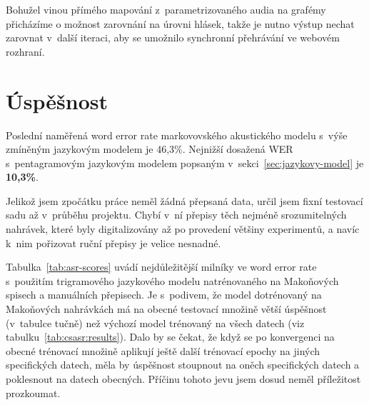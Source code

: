 Bohužel vinou přímého mapování z~parametrizovaného audia na grafémy přicházíme o
možnost zarovnání na úrovni hlásek, takže je nutno výstup nechat zarovnat
v~další iteraci, aby se umožnilo synchronní přehrávání ve webovém rozhraní.

\section{Úspěšnost}
\label{sec:evaluace}

Poslední naměřená word error rate markovovského akustického modelu s~výše zmíněným
jazykovým modelem je 46,3\%. Nejnižší dosažená WER s~pentagramovým jazykovým
modelem popsaným v~sekci~\ref{sec:jazykovy-model} je \textbf{10,3\%}.

Jelikož jsem zpočátku práce neměl žádná přepsaná data, určil jsem fixní testovací sadu
až v~průběhu projektu. Chybí v~ní přepisy těch
nejméně srozumitelných nahrávek, které byly digitalizovány až po provedení
většiny experimentů, a navíc k~nim pořizovat ruční přepisy je velice nesnadné.

Tabulka~\ref{tab:asr-scores} uvádí nejdůležitější milníky ve word error rate
s~použitím trigramového jazykového modelu natrénovaného na Makoňových spisech a
manuálních přepisech. Je
s~podivem, že model dotrénovaný na Makoňových nahrávkách má na obecné testovací
množině větší úspěšnost (v~tabulce tučně) než výchozí model trénovaný na všech datech
(viz tabulku~\ref{tab:csasr:results}). Dalo by se čekat, že
když se po konvergenci na obecné trénovací množině aplikují ještě
další trénovací epochy na jiných specifických datech, měla by úspěšnost stoupnout na
oněch specifických datech a poklesnout na datech obecných. Příčinu tohoto jevu
jsem dosud neměl příležitost prozkoumat.

